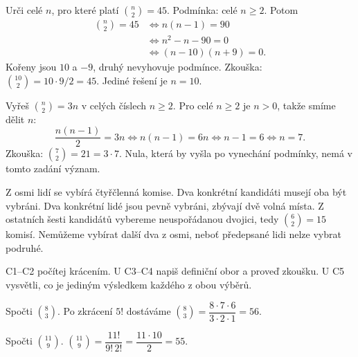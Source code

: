 \documentclass[11pt,a4paper]{article}
\begin{document}
\begin{prikladReseniBox}[title={Příklad P3},breakable=false]
Urči celé $n$, pro které platí $\binom n2=45$.
\tcblower
Podmínka: celé $n\geq2$. Potom
\begin{align*}
 \binom n2=45&\iff n(n-1)=90\\
 &\iff n^2-n-90=0\\
 &\iff(n-10)(n+9)=0.
\end{align*}
Kořeny jsou $10$ a $-9$, druhý nevyhovuje podmínce. Zkouška: $\binom{10}{2}=10\cdot9/2=45$. Jediné řešení je $n=10$.
\end{prikladReseniBox}


\begin{prikladReseniBox}[title={Příklad P4}]
Vyřeš $\binom n2=3n$ v celých číslech $n\geq2$.
\tcblower
Pro celé $n\geq2$ je $n>0$, takže smíme dělit $n$:
\[
 \frac{n(n-1)}2=3n\iff n(n-1)=6n\iff n-1=6\iff n=7.
\]
Zkouška: $\binom72=21=3\cdot7$. Nula, která by vyšla po vynechání podmínky, nemá v tomto zadání význam.
\end{prikladReseniBox}


\begin{prikladReseniBox}[title={Příklad P5}]
Z osmi lidí se vybírá čtyřčlenná komise. Dva konkrétní kandidáti musejí oba být vybráni.
\tcblower
Dva konkrétní lidé jsou pevně vybráni, zbývají dvě volná místa. Z ostatních šesti kandidátů vybereme neuspořádanou dvojici, tedy $\binom62=15$ komisí. Nemůžeme vybírat další dva z osmi, neboť předepsané lidi nelze vybrat podruhé.
\end{prikladReseniBox}


\newpage
{}

C1–C2 počítej krácením. U C3–C4 napiš definiční obor a proveď zkoušku. U C5 vysvětli, co je jediným výsledkem každého z obou výběrů.

\begin{zadaniReseniBox}[title={Úloha C1}]
Spočti \(\binom83\).
\tcblower
Po zkrácení $5!$ dostáváme $\binom83=\dfrac{8\cdot7\cdot6}{3\cdot2\cdot1}=56$.
\end{zadaniReseniBox}

\begin{zadaniReseniBox}[title={Úloha C2}]
Spočti \(\binom{11}{9}\).
\tcblower
$\binom{11}{9}=\dfrac{11!}{9!\,2!}=\dfrac{11\cdot10}{2}=55$.
\end{zadaniReseniBox}
\end{document}
